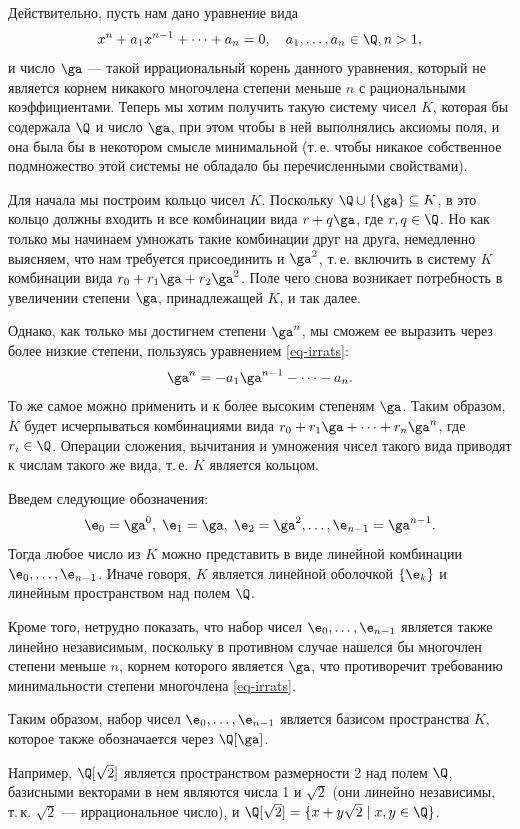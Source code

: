 \begin{enumerate}
Действительно, пусть нам дано уравнение вида
\begin{equation}\label{eq-irrats}
x^n+a_1x^{n-1}+\dots+a_n=0,\quad a_1,\dots,a_n\in\Q, n>1,
\end{equation}
и число $\ga$ --- такой иррациональный корень данного уравнения, который не является корнем никакого многочлена степени меньше $n$ с рациональными коэффициентами. Теперь мы хотим получить такую систему чисел $K$, которая бы содержала $\Q$ и число $\ga$, при этом чтобы в ней выполнялись аксиомы поля, и она была бы в некотором смысле минимальной (т.\,е. чтобы никакое собственное подмножество этой системы не обладало бы перечисленными свойствами).

Для начала мы построим кольцо чисел $K$. Поскольку $\Q\cup\{\ga\}\subseteq K$, в это кольцо должны входить и все комбинации вида $r+q\ga$, где $r,q\in\Q$. Но как только мы начинаем умножать такие комбинации друг на друга, немедленно выясняем, что нам требуется присоединить и $\ga^2$, т.\,е. включить в систему $K$ комбинации вида $r_0+r_1\ga+r_2\ga^2$. Поле чего снова возникает потребность в увеличении степени $\ga$, принадлежащей $K$, и так далее.

Однако, как только мы достигнем степени $\ga^n$, мы сможем ее выразить через более низкие степени, пользуясь уравнением \eqref{eq-irrats}:
$$
\ga^n = -a_1\ga^{n-1}-\dots-a_n.
$$
То же самое можно применить и к более высоким степеням $\ga$. Таким образом, $K$ будет исчерпываться комбинациями вида $r_0+r_1\ga+\dots+r_n\ga^n$, где $r_i\in\Q$. Операции сложения, вычитания и умножения чисел такого вида приводят к числам такого же вида, т.\,е. $K$ является кольцом.

Введем следующие обозначения:
$$
\e_0=\ga^0,\;\e_1=\ga,\;\e_2=\ga^2,\dots,\e_{n-1}=\ga^{n-1}.
$$
Тогда любое число из $K$ можно представить в виде линейной комбинации $\e_0,\dots,\e_{n-1}$. Иначе говоря, $K$ является линейной оболочкой $\{\e_k\}$ и линейным пространством над полем $\Q$.

Кроме того, нетрудно показать, что набор чисел $\e_0,\dots,\e_{n-1}$ является также линейно независимым, поскольку в противном случае нашелся бы многочлен степени меньше $n$, корнем которого является $\ga$, что противоречит требованию минимальности степени многочлена \eqref{eq-irrats}.

Таким образом, набор чисел $\e_0,\dots,\e_{n-1}$ является базисом пространства $K$, которое также обозначается через $\Q[\ga]$.

Например, $\Q[\sqrt 2]$ является пространством размерности 2 над полем $\Q$, базисными векторами в нем являются числа 1 и $\sqrt 2$ (они линейно независимы, т.\,к. $\sqrt 2$ --- иррациональное число), и $\Q[\sqrt 2]=\{x+y\sqrt 2\mid x,y\in\Q\}$.


\end{enumerate}
